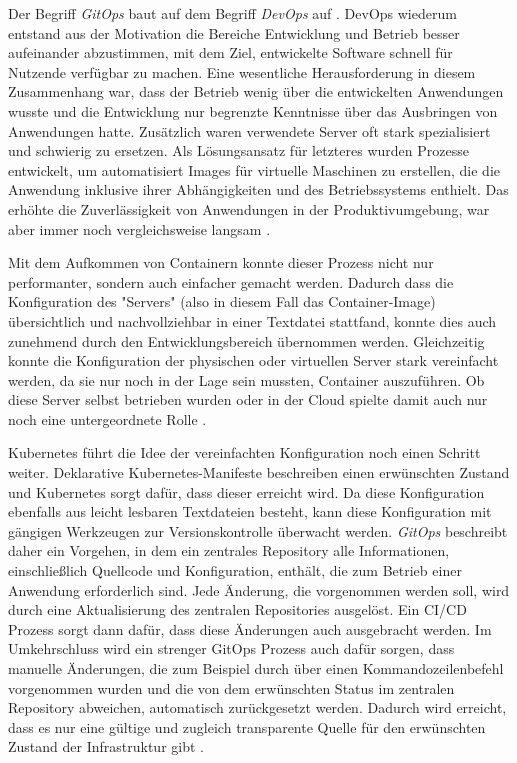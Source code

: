 \documentclass[11pt,a4paper]{article}
\begin{document}
Der Begriff \emph{GitOps} baut auf dem Begriff \emph{DevOps} auf \cite{cicd_with_kubernetes}.
DevOps wiederum entstand aus der Motivation die Bereiche Entwicklung und Betrieb
besser aufeinander abzustimmen, mit dem Ziel, entwickelte Software schnell
für Nutzende verfügbar zu machen. Eine wesentliche Herausforderung in diesem Zusammenhang
war, dass der Betrieb wenig über die entwickelten Anwendungen wusste und
die Entwicklung nur begrenzte Kenntnisse über das Ausbringen von Anwendungen hatte.
Zusätzlich waren verwendete Server oft stark spezialisiert und schwierig zu ersetzen.
Als Lösungsansatz für letzteres wurden Prozesse entwickelt, um automatisiert Images
für virtuelle Maschinen zu erstellen, die die Anwendung inklusive ihrer Abhängigkeiten
und des Betriebssystems enthielt. Das erhöhte die Zuverlässigkeit von
Anwendungen in der Produktivumgebung, war aber immer noch vergleichsweise langsam \cite{cicd_with_kubernetes}.

Mit dem Aufkommen von Containern konnte dieser Prozess nicht nur performanter, sondern
auch einfacher gemacht werden. Dadurch dass die Konfiguration des "Servers" (also in diesem
Fall das Container-Image) übersichtlich und nachvollziehbar in einer Textdatei stattfand,
konnte dies auch zunehmend durch den Entwicklungsbereich übernommen werden.
Gleichzeitig konnte die Konfiguration der physischen oder virtuellen Server
stark vereinfacht werden, da sie nur noch in der Lage sein mussten, Container auszuführen.
Ob diese Server selbst betrieben wurden oder in der Cloud spielte damit auch nur
noch eine untergeordnete Rolle \cite{cicd_with_kubernetes}.

Kubernetes führt die Idee der vereinfachten Konfiguration noch einen Schritt weiter.
Deklarative Kubernetes-Manifeste beschreiben einen erwünschten Zustand
und Kubernetes sorgt dafür, dass dieser erreicht wird.
Da diese Konfiguration ebenfalls aus leicht lesbaren Textdateien besteht,
kann diese Konfiguration mit gängigen Werkzeugen zur Versionskontrolle
überwacht werden. \emph{GitOps} beschreibt daher ein Vorgehen,
in dem ein zentrales Repository alle Informationen, einschließlich Quellcode und Konfiguration,
enthält, die zum Betrieb einer Anwendung erforderlich sind.
Jede Änderung, die vorgenommen werden soll, wird durch eine Aktualisierung
des zentralen Repositories ausgelöst. Ein CI/CD Prozess sorgt dann dafür,
dass diese Änderungen auch ausgebracht werden.
Im Umkehrschluss wird ein strenger GitOps Prozess auch dafür sorgen,
dass manuelle Änderungen, die zum Beispiel durch über einen Kommandozeilenbefehl
vorgenommen wurden und die von dem erwünschten Status im zentralen Repository
abweichen, automatisch zurückgesetzt werden.
Dadurch wird erreicht, dass es nur eine gültige und zugleich transparente
Quelle für den erwünschten Zustand der Infrastruktur gibt \cite{domingus2022cloud} \cite{cicd_with_kubernetes}.
\end{document}
